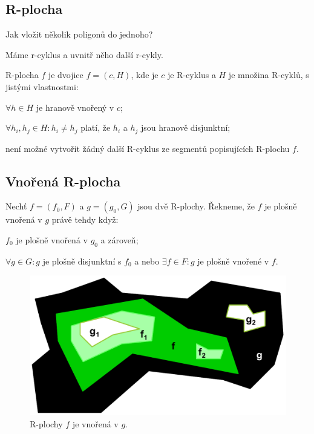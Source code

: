 \subsection{R-plocha}

\begin{compactitem}
    \item Jak vložit několik poligonů do jednoho? \begin{compactitem}
        \item Máme r-cyklus a uvnitř něho další r-cykly.
    \end{compactitem}

    \item R-plocha $f$ je dvojice $f = (c, H)$, kde je $c$ je R-cyklus a $H$ je množina R-cyklů, s jistými vlastnostmi: \begin{compactitem}
        \item $ \forall h \in H $ je hranově vnořený v $c$;
        \item $ \forall h_i, h_j \in H : h_i \not= h_j$ platí, že $h_i$ a $h_j$ jsou hranově disjunktní;
        \item není možné vytvořit žádný další R-cyklus ze segmentů popisujících R-plochu $f$.
    \end{compactitem}

\end{compactitem}

\subsection{Vnořená R-plocha}

\begin{compactitem}
    \item Nechť $f = (f_0, F)$ a $g = (g_0, G)$ jsou dvě R-plochy. Řekneme, že $f$ je plošně vnořená v $g$ právě tehdy když: \begin{compactitem}
        \item $f_0$ je plošně vnořená v $g_0$ a zároveň;
        \item $\forall g \in G : g$ je plošně disjunktní s $f_0$ a nebo $\exists f \in F : g$ je plošně vnořené v $f$.
    \end{compactitem}
\end{compactitem}

\begin{figure}[H]
    \centering
    \includegraphics[width=0.75\linewidth]{r_area.pdf}
    \caption{R-plochy $f$ je vnořená v $g$.}
\end{figure}

